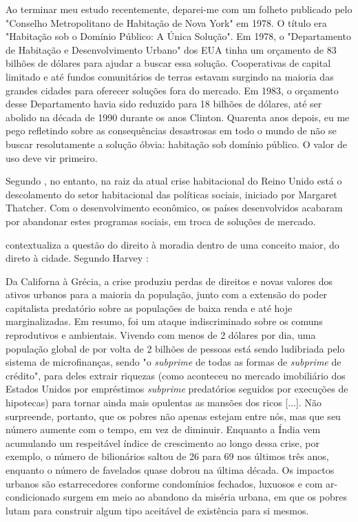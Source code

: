 \documentclass[
	12pt,				%
	oneside,			%
	a4paper,			%
	chapter=TITLE,		%
	section=TITLE,		%
	english,			%
	brazil				%
	]{abntex2}
\begin{document}
\begin{refsection}
\begin{citacao}
Ao terminar meu estudo recentemente, deparei-me com um folheto publicado pelo
"Conselho Metropolitano de Habitação de Nova York" em 1978. O título era
"Habitação sob o Domínio Público: A Única Solução". Em 1978, o "Departamento de
Habitação e Desenvolvimento Urbano" dos \gls{EUA} tinha um orçamento de 83
bilhões de dólares para ajudar a buscar essa solução. Cooperativas de capital
limitado e até fundos comunitários de terras estavam surgindo na maioria das
grandes cidades para oferecer soluções fora do mercado. Em 1983, o orçamento
desse Departamento havia sido reduzido para 18 bilhões de dólares, até ser
abolido na década de 1990 durante os anos Clinton. Quarenta anos depois, eu me
pego refletindo sobre as consequências desastrosas em todo o mundo de não se
buscar resolutamente a solução óbvia: habitação sob domínio público. O valor de
uso deve vir primeiro.
\end{citacao}
Segundo \textcite{rolnik}, no entanto, na raiz da atual crise habitacional do Reino Unido
está o descolamento do setor habitacional das políticas sociais, iniciado por
Margaret Thatcher. Com o desenvolvimento econômico, os países desenvolvidos
acabaram por abandonar estes programas sociais, em troca de soluções de
mercado.

\textcite{harvey} contextualiza a questão do direito à moradia dentro de uma conceito
maior, do direto à cidade. Segundo Harvey \autocite*[166]{harvey}:
\begin{citacao}
Da Californa à Grécia, a crise produziu perdas de direitos e novas valores dos
ativos urbanos para a maioria da população, junto com a extensão do poder
capitalista predatório sobre as populações de baixa renda e até hoje
marginalizadas. Em resumo, foi um ataque indiscriminado sobre os comuns
reprodutivos e ambientais. Vivendo com menos de 2 dólares por dia, uma população
global de por volta de 2 bilhões de pessoas está sendo ludibriada pelo sistema
de microfinanças, sendo "o \emph{subprime} de todas as formas de \emph{subprime}
de crédito", para deles extrair riquezas (como aconteceu no mercado imobiliário
dos Estados Unidos por empréstimos \emph{subprime} predatórios seguidos por
execuções de hipotecas) para tornar ainda mais opulentas as mansões dos ricos
[...]. Não surpreende, portanto, que os pobres não apenas estejam entre nós, mas
que seu número aumente com o tempo, em vez de diminuir. Enquanto a Índia vem
acumulando um respeitável índice de crescimento ao longo dessa crise, por
exemplo, o número de bilionários saltou de 26 para 69 nos últimos três anos,
enquanto o número de favelados quase dobrou na última década. Os impactos
urbanos são estarrecedores conforme condomínios fechados, luxuosos e com
ar-condicionado surgem em meio ao abandono da miséria urbana, em que os pobres
lutam para construir algum tipo aceitável de existência para si mesmos.
\end{citacao}
\hypertarget{breve-histuxf3rico-das-poluxedticas-habitacionais-e-urbanas}{%
}
\end{refsection}
\end{document}
